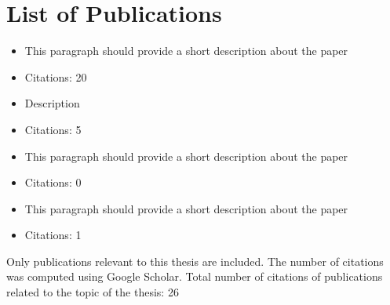 \chapter*{List of Publications}


\noindent{}
\begin{itemize}[noitemsep,topsep=0pt]

\item This paragraph should provide a short description about the paper
\item Citations: 20

\end{itemize}\vspace{.5\baselineskip}

\noindent{}
\begin{itemize}[noitemsep,topsep=0pt]

\item Description

\item Citations: 5
\end{itemize}\vspace{.5\baselineskip}

\noindent{}
\begin{itemize}[noitemsep,topsep=0pt]

\item This paragraph should provide a short description about the paper
\item Citations: 0

\end{itemize}\vspace{.5\baselineskip}

\noindent{}
\begin{itemize}[noitemsep,topsep=0pt]

\item This paragraph should provide a short description about the paper
\item Citations: 1

\end{itemize}\vspace{.5\baselineskip}

\vfill

\noindent Only publications relevant to this thesis are included. The number of
citations was computed using Google Scholar. Total number of citations of
publications related to the topic of the thesis: 26
